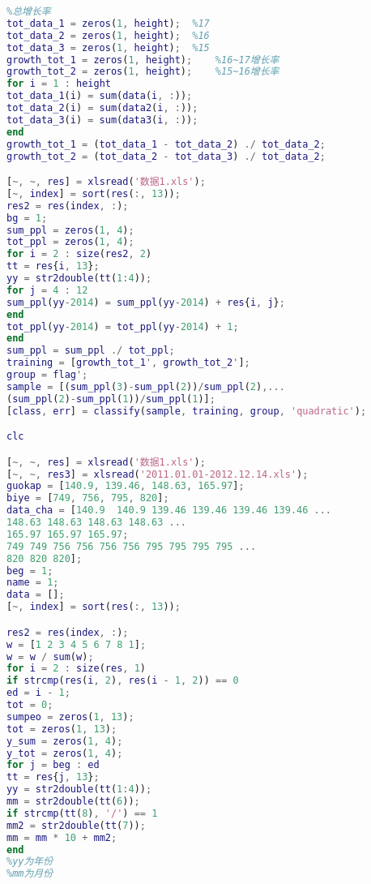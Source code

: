 \documentclass{mcmthesis}
\begin{document}
\begin{appendices}
\begin{lstlisting}[language=matlab]
%%
%总增长率
tot_data_1 = zeros(1, height);  %17
tot_data_2 = zeros(1, height);  %16
tot_data_3 = zeros(1, height);  %15
growth_tot_1 = zeros(1, height);    %16~17增长率
growth_tot_2 = zeros(1, height);    %15~16增长率
for i = 1 : height
tot_data_1(i) = sum(data(i, :));
tot_data_2(i) = sum(data2(i, :));
tot_data_3(i) = sum(data3(i, :));
end
growth_tot_1 = (tot_data_1 - tot_data_2) ./ tot_data_2;
growth_tot_2 = (tot_data_2 - tot_data_3) ./ tot_data_2;

[~, ~, res] = xlsread('数据1.xls');
[~, index] = sort(res(:, 13));
res2 = res(index, :);
bg = 1;
sum_ppl = zeros(1, 4);
tot_ppl = zeros(1, 4);
for i = 2 : size(res2, 2)
tt = res{i, 13};
yy = str2double(tt(1:4));
for j = 4 : 12
sum_ppl(yy-2014) = sum_ppl(yy-2014) + res{i, j};
end
tot_ppl(yy-2014) = tot_ppl(yy-2014) + 1;
end
sum_ppl = sum_ppl ./ tot_ppl;
training = [growth_tot_1', growth_tot_2'];
group = flag';
sample = [(sum_ppl(3)-sum_ppl(2))/sum_ppl(2),...
(sum_ppl(2)-sum_ppl(1))/sum_ppl(1)];
[class, err] = classify(sample, training, group, 'quadratic');

clc

[~, ~, res] = xlsread('数据1.xls');
[~, ~, res3] = xlsread('2011.01.01-2012.12.14.xls');
guokap = [140.9, 139.46, 148.63, 165.97];
biye = [749, 756, 795, 820];
data_cha = [140.9  140.9 139.46 139.46 139.46 139.46 ...
148.63 148.63 148.63 148.63 ...
165.97 165.97 165.97;
749 749 756 756 756 756 795 795 795 795 ...
820 820 820];
beg = 1;
name = 1;
data = [];
[~, index] = sort(res(:, 13));

res2 = res(index, :);
w = [1 2 3 4 5 6 7 8 1];
w = w / sum(w);
for i = 2 : size(res, 1)
if strcmp(res(i, 2), res(i - 1, 2)) == 0
ed = i - 1;
tot = 0;
sumpeo = zeros(1, 13);
tot = zeros(1, 13);
y_sum = zeros(1, 4);
y_tot = zeros(1, 4);
for j = beg : ed
tt = res{j, 13};
yy = str2double(tt(1:4));
mm = str2double(tt(6));
if strcmp(tt(8), '/') == 1
mm2 = str2double(tt(7));
mm = mm * 10 + mm2;
end
%yy为年份
%mm为月份


\end{lstlisting}
\end{appendices}
\end{document}

